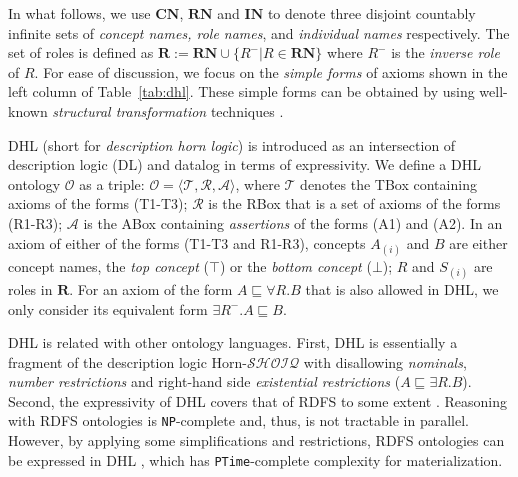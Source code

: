 In what follows, we use $\textbf{CN}$, $\textbf{RN}$ and $\textbf{IN}$
to denote three disjoint countably
infinite sets of \emph{concept names, role names}, and \emph{individual names} respectively.
The set of roles is defined as $\textbf{R}:=\textbf{RN}\cup\{R^-|R\in\textbf{RN}\}$
where $R^-$ is the \emph{inverse role} of $R$.
For ease of discussion, we focus on the \emph{simple forms} of axioms shown
in the left column of Table~\ref{tab:dhl}. These simple forms can be obtained by using
well-known \emph{structural transformation} techniques \cite{KrotzschRH07,Kazakov09}.

DHL (short for \emph{description horn logic}) \cite{GrosofHVD03} is introduced as an
intersection of description logic (DL) and datalog in terms of expressivity.
We define a DHL ontology $\mathcal{O}$ as a triple:
$\mathcal{O}=\langle\mathcal{T},\mathcal{R},\mathcal{A}\rangle$, where
$\mathcal{T}$ denotes the TBox containing axioms of the forms (T1-T3);
$\mathcal{R}$ is the RBox that is a set of axioms of the forms (R1-R3);
$\mathcal{A}$ is the ABox containing \emph{assertions} of the forms (A1) and (A2).
In an axiom of either of  the forms (T1-T3 and R1-R3), concepts $A_{(i)}$ and $B$ are either
concept names, the \emph{top concept} ($\top$) or the \emph{bottom concept} ($\bot$); $R$ and $S_{(i)}$
are roles in $\textbf{R}$.
For an axiom of the form $A\sqsubseteq\forall R.B$ that is also allowed in DHL, we only consider its
equivalent form $\exists R^-.A\sqsubseteq B$.

DHL is related with other ontology languages.
First, DHL is essentially a fragment of the description logic Horn-$\mathcal{SHOIQ}$ with
disallowing \emph{nominals}, \emph{number restrictions} and
right-hand side \emph{existential restrictions} ($A\sqsubseteq\exists R.B$).
Second, the expressivity of DHL covers that of RDFS to some extent \cite{GrosofHVD03}.
Reasoning with RDFS ontologies is \texttt{NP}-complete \cite{Horst05}
and, thus, is not tractable in parallel.
However, by applying some simplifications and restrictions, RDFS ontologies can be
expressed in DHL \cite{GrosofHVD03}, which has \texttt{PTime}-complete complexity for
materialization.

